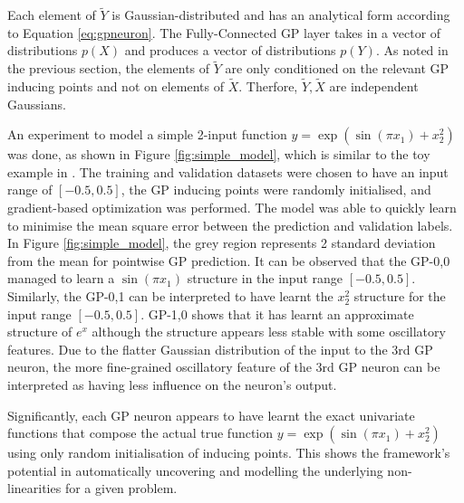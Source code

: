 \documentclass{article}
\begin{document}
Each element of $\tilde{Y}$ is Gaussian-distributed and has an analytical form according to Equation \ref{eq:gpneuron}. The Fully-Connected GP layer takes in a vector of distributions $p(X)$ and produces a vector of distributions $p(Y)$. As noted in the previous section, the elements of $\tilde{Y}$ are only conditioned on the relevant GP inducing points and not on elements of $\tilde{X}$. Therfore, $\tilde{Y},\tilde{X}$ are independent Gaussians.

An experiment to model a simple 2-input function $y=\exp(\sin(\pi x_1)+x_2^2)$ was done, as shown in Figure \ref{fig:simple_model}, which is similar to the toy example in \cite{liu2024kan}. The training and validation datasets were chosen to have an input range of $[-0.5, 0.5]$, the GP inducing points were randomly initialised, and gradient-based optimization was performed. The model was able to quickly learn to minimise the mean square error between the prediction and validation labels. In Figure \ref{fig:simple_model}, the grey region represents 2 standard deviation from the mean for pointwise GP prediction. It can be observed that the GP-0,0 managed to learn a $\sin(\pi x_1)$ structure in the input range $[-0.5, 0.5]$. Similarly, the GP-0,1 can be interpreted to have learnt the $x_2^2$ structure for the input range $[-0.5, 0.5]$. GP-1,0 shows that it has learnt an approximate structure of $e^x$ although the structure appears less stable with some oscillatory features. Due to the flatter Gaussian distribution of the input to the 3rd GP neuron, the more fine-grained oscillatory feature of the 3rd GP neuron can be interpreted as having less influence on the neuron's output.

Significantly, each GP neuron appears to have learnt the exact univariate functions that compose the actual true function $y=\exp(\sin(\pi x_1)+x_2^2)$ using only random initialisation of inducing points. This shows the framework's potential in automatically uncovering and modelling the underlying non-linearities for a given problem.
\end{document}
